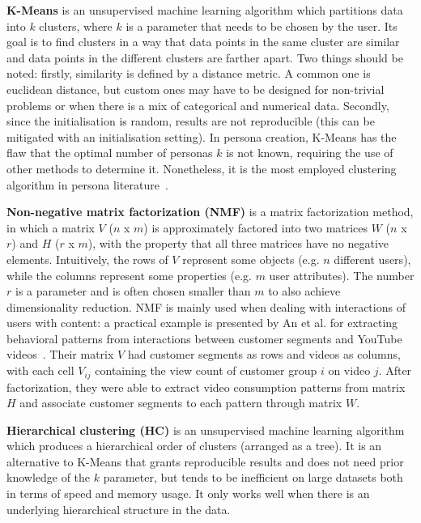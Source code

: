 \textbf{K-Means} is an unsupervised machine learning algorithm which partitions data into $k$ clusters, where $k$ is a parameter that needs to be chosen by the user. Its goal is to find clusters in a way that data points in the same cluster are similar and data points in the different clusters are farther apart. Two things should be noted: firstly, similarity is defined by a distance metric. A common one is euclidean distance, but custom ones may have to be designed for non-trivial problems or when there is a mix of categorical and numerical data. Secondly, since the initialisation is random, results are not reproducible (this can be mitigated with an initialisation setting). In persona creation, K-Means has the flaw that the optimal number of personas $k$ is not known, requiring the use of other methods to determine it. Nonetheless, it is the most employed clustering algorithm in persona literature~\cite{salminen2021survey}.

\textbf{Non-negative matrix factorization (NMF)} is a matrix factorization method, in which a matrix $V$ ($n$ x $m$) is approximately factored into two matrices $W$ ($n$ x $r$) and $H$ ($r$ x $m$), with the property that all three matrices have no negative elements. Intuitively, the rows of $V$ represent some objects (e.g. $n$ different users), while the columns represent some properties (e.g. $m$ user attributes). The number $r$ is a parameter and is often chosen smaller than $m$ to also achieve dimensionality reduction. NMF is mainly used when dealing with interactions of users with content: a practical example is presented by An et al. for extracting behavioral patterns from interactions between customer segments and YouTube videos~\cite{an2018customer}. Their matrix $V$ had customer segments as rows and videos as columns, with each cell $V_{ij}$ containing the view count of customer group $i$ on video $j$. After factorization, they were able to extract video consumption patterns from matrix $H$ and associate customer segments to each pattern through matrix $W$.

\textbf{Hierarchical clustering (HC)} is an unsupervised machine learning algorithm which produces a hierarchical order of clusters (arranged as a tree). It is an alternative to K-Means that grants reproducible results and does not need prior knowledge of the $k$ parameter, but tends to be inefficient on large datasets both in terms of speed and memory usage. It only works well when there is an underlying hierarchical structure in the data.

